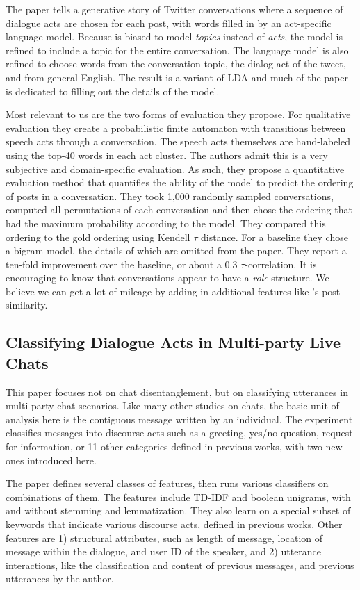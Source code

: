 \documentclass{article}
\begin{document}
The paper tells a generative story of Twitter conversations where a sequence of dialogue
acts are chosen for each post, with words filled in by an act-specific language model.
Because is biased to model \textit{topics}
instead of \textit{acts}, the model is refined to include a topic 
for the entire conversation. The language model is also refined to choose words from
the conversation topic, the dialog act of the tweet, and from general English. The result
is a variant of LDA and much of the paper is dedicated to filling out the details of the model.

Most relevant to us are the two forms of evaluation they propose. For
qualitative evaluation they create a probabilistic finite automaton with
transitions between speech acts through a conversation. The speech acts
themselves are hand-labeled using the top-40 words in each act cluster. The 
authors admit this is a very subjective and domain-specific evaluation. As such,
they propose a quantitative evaluation method that quantifies the ability of
the model to predict the ordering of posts in a conversation. They took
1,000 randomly sampled conversations, computed all permutations
of each conversation and then chose the ordering that had the maximum
probability according to the model. They compared this ordering to the gold
ordering using Kendell $\tau$ distance. For a baseline they chose a bigram
model, the details of which are omitted from the paper. They report a ten-fold improvement
over the baseline, or about a 0.3 $\tau$-correlation. It is encouraging to know
that conversations appear to have a \textit{role} structure. We believe we can get a lot of mileage
by adding in additional features like \cite{Wang2008a}'s post-similarity.

\subsection{Classifying Dialogue Acts in Multi-party Live Chats}

This paper focuses not on chat disentanglement, but on classifying utterances
in multi-party chat scenarios. Like many other studies on chats, the basic unit
of analysis here is the contiguous message written by an individual. The
experiment classifies messages into discourse acts such as a greeting, yes/no
question, request for information, or 11 other categories defined in previous
works, with two new ones introduced here.

The paper defines several classes of features, then runs various classifiers on
combinations of them. The features include TD-IDF and boolean unigrams, with
and without stemming and lemmatization. They also learn on a special subset of
keywords that indicate various discourse acts, defined in previous works. Other
features are 1) structural attributes, such as length of message, location of
message within the dialogue, and user ID of the speaker, and 2) utterance
interactions, like the classification and content of previous messages, and
previous utterances by the author.
\end{document}
